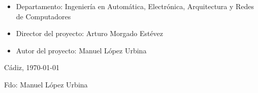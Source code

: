 \begin{itemize}
\item \large{Departamento: Ingeniería en Automática, Electrónica, Arquitectura y Redes de Computadores}
\item \large{Director del proyecto: Arturo Morgado Estévez}
\item \large{Autor del proyecto: Manuel López Urbina}
\end{itemize}

\vspace{1.0cm}

\begin{flushright}
  \large{Cádiz, \today} \\

  \vspace{2.5cm}

  \large{Fdo: Manuel López Urbina}
\end{flushright}
